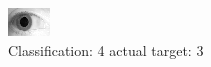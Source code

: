 \begin{figure}[h!]
\begin{center}
\includegraphics[width=0.60\columnwidth]{figures/ID1862_class_4_target_3.png}
\end{center}
\caption{ Classification: 4 actual target: 3}
\label{fig:ID1862_class_4_target_3}
\end{figure}
